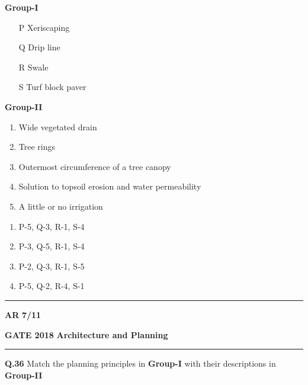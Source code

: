 \documentclass{article}
\begin{document}
\begin{multicols}{2}
\noindent \hspace{1.5cm} \textbf{Group-I}
\begin{enumerate}[label=(\Alph*),leftmargin=1.5cm ]
    \item[P] Xeriscaping
    \item[Q] Drip line
    \item[R] Swale
    \item[S] Turf block paver
\end{enumerate}

\columnbreak

\noindent \hspace{1cm} \textbf{Group-II}
\begin{enumerate}[label=(\arabic*) , leftmargin=1.5cm] 
    \item Wide vegetated drain
    \item Tree rings
    \item Outermost circumference of a tree canopy
    \item Solution to topsoil erosion and water permeability
    \item A little or no irrigation
\end{enumerate}
\end{multicols}

\vspace{0.3cm}

\begin{multicols}{2}
\begin{enumerate}[ label=(\Alph*) , leftmargin=1.5cm ]
    \item P-5, Q-3, R-1, S-4
    \item P-3, Q-5, R-1, S-4
    \item P-2, Q-3, R-1, S-5
    \item P-5, Q-2, R-4, S-1
\end{enumerate}
\end{multicols}


 \noindent
\hrule \vspace{0.0875CM} \textbf{AR} \hfill  \textbf{7/11}

\newpage
\noindent
\textbf{GATE 2018} \hfill \textbf{Architecture and Planning}
\vspace{0.0012cm} \hrule

\noindent\textbf{Q.36} Match the planning principles in \textbf{Group-I} with their descriptions in \textbf{Group-II}
\end{document}
